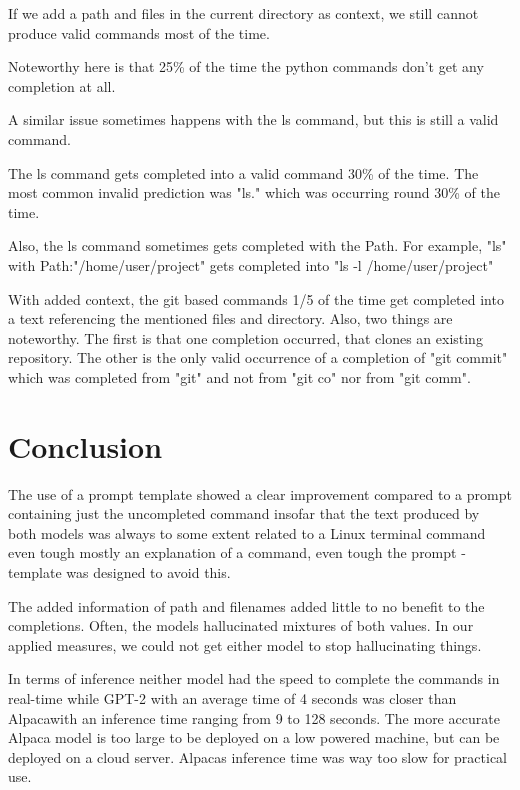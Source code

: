 If we add a path and files in the current directory as context, we still cannot produce valid commands most of the time. 



Noteworthy here is that 25\% of the time the python commands don't get any completion at all.



A similar issue sometimes happens with the ls command, but this is still a valid command. 

The ls command gets completed into a valid command 30\% of the time. The most common invalid prediction was "ls." which was occurring round 30\% of the time.


Also, the ls command sometimes gets completed with the Path. For example, "ls" with Path:"/home/user/project" gets completed into "ls -l /home/user/project" 




With added context, the git based commands 1/5 of the time get completed into a text referencing the mentioned files and directory. Also, two things are noteworthy. The first is that one completion occurred, that clones an existing repository. The other is the only valid occurrence of a completion of "git commit" which was completed from "git" and not from "git co" nor from "git comm".

\section{Conclusion}

The use of a prompt template showed a clear improvement compared to a prompt containing just the uncompleted command insofar that the text produced by both models was always to some extent related to a Linux terminal command even tough mostly an explanation of a command, even tough the prompt -template was designed to avoid this.


The added information of path and filenames added little to no benefit to the completions.
Often, the models hallucinated mixtures of both values. In our applied measures, we could not get either model to stop hallucinating things.

 

In terms of inference neither model had the speed to complete the commands in real-time while  GPT-2 with an average time of 4 seconds was closer than Alpacawith an inference time ranging from 9 to 128 seconds. The more accurate Alpaca model is too large to be deployed on a low powered machine, but can be deployed on a cloud server. Alpacas inference time was way too slow for practical use. 


